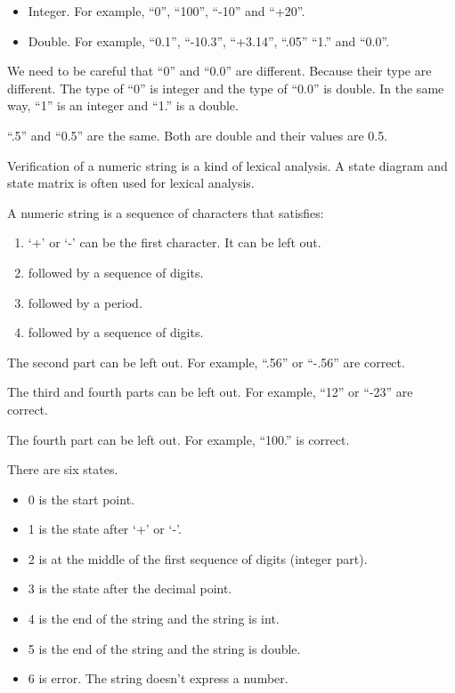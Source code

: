 \begin{itemize}
\tightlist
\item
  Integer. For example, ``0'', ``100'', ``-10'' and ``+20''.
\item
  Double. For example, ``0.1'', ``-10.3'', ``+3.14'', ``.05'' ``1.'' and
  ``0.0''.
\end{itemize}

We need to be careful that ``0'' and ``0.0'' are different. Because
their type are different. The type of ``0'' is integer and the type of
``0.0'' is double. In the same way, ``1'' is an integer and ``1.'' is a
double.

``.5'' and ``0.5'' are the same. Both are double and their values are
0.5.

Verification of a numeric string is a kind of lexical analysis. A state
diagram and state matrix is often used for lexical analysis.

A numeric string is a sequence of characters that satisfies:

\begin{enumerate}
\def\labelenumi{\arabic{enumi}.}
\tightlist
\item
  `+' or `-' can be the first character. It can be left out.
\item
  followed by a sequence of digits.
\item
  followed by a period.
\item
  followed by a sequence of digits.
\end{enumerate}

The second part can be left out. For example, ``.56'' or ``-.56'' are
correct.

The third and fourth parts can be left out. For example, ``12'' or
``-23'' are correct.

The fourth part can be left out. For example, ``100.'' is correct.

There are six states.

\begin{itemize}
\tightlist
\item
  0 is the start point.
\item
  1 is the state after `+' or `-'.
\item
  2 is at the middle of the first sequence of digits (integer part).
\item
  3 is the state after the decimal point.
\item
  4 is the end of the string and the string is int.
\item
  5 is the end of the string and the string is double.
\item
  6 is error. The string doesn't express a number.
\end{itemize}

